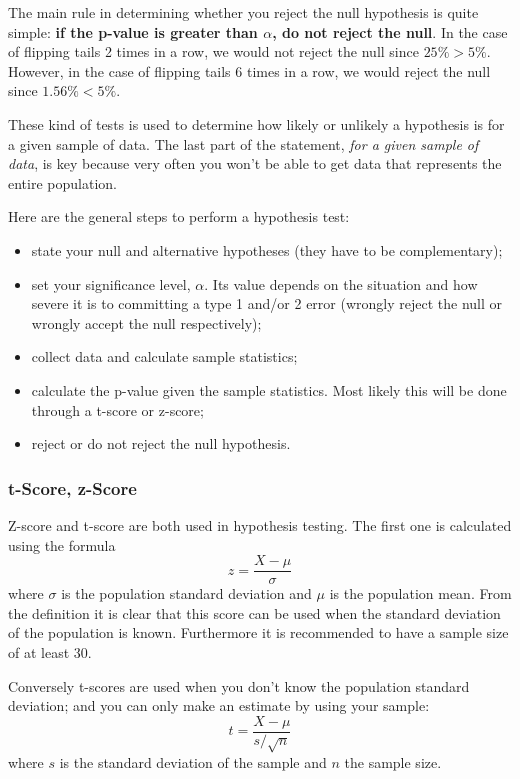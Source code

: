The main rule in determining whether you reject the null hypothesis is
quite simple: \textbf{if the p-value is greater than \(\alpha\), do not
reject the null}. In the case of flipping tails 2 times in a row, we
would not reject the null since \(25\% > 5\%\). However, in the case of
flipping tails 6 times in a row, we would reject the null since
\(1.56\% < 5\%\).

These kind of tests is used to determine how likely or unlikely a
hypothesis is for a given sample of data. The last part of the
statement, \emph{for a given sample of data}, is key because very often
you won't be able to get data that represents the entire population.

Here are the general steps to perform a hypothesis test:

\begin{itemize}
\tightlist
\item
  state your null and alternative hypotheses (they have to be complementary);
\item
  set your significance level, \(\alpha\). Its value depends
  on the situation and how severe it is to committing a type 1 and/or 2 error (wrongly reject the null or wrongly accept the null respectively);
\item
  collect data and calculate sample statistics;
\item
  calculate the p-value given the sample statistics. Most likely this
  will be done through a t-score or z-score;
\item
  reject or do not reject the null hypothesis.
\end{itemize}

\subsubsection{t-Score, z-Score}\label{t-score-z-score}

Z-score and t-score are both used in hypothesis testing. The first one
is calculated using the formula 
\begin{equation}
z = \frac{X-\mu}{\sigma}
\end{equation} 
where \(\sigma\) is the population standard deviation and \(\mu\) is the
population mean. From the definition it is clear that this score can be
used when the standard deviation of the population is known. Furthermore
it is recommended to have a sample size of at least 30.

Conversely t-scores are used when you don't know the population standard
deviation; and you can only make an estimate by using your sample:
\begin{equation}
t = \frac{X - \mu}{s/\sqrt{n}}
\end{equation} 
where \(s\) is the standard deviation of the sample and \(n\) the sample size.

